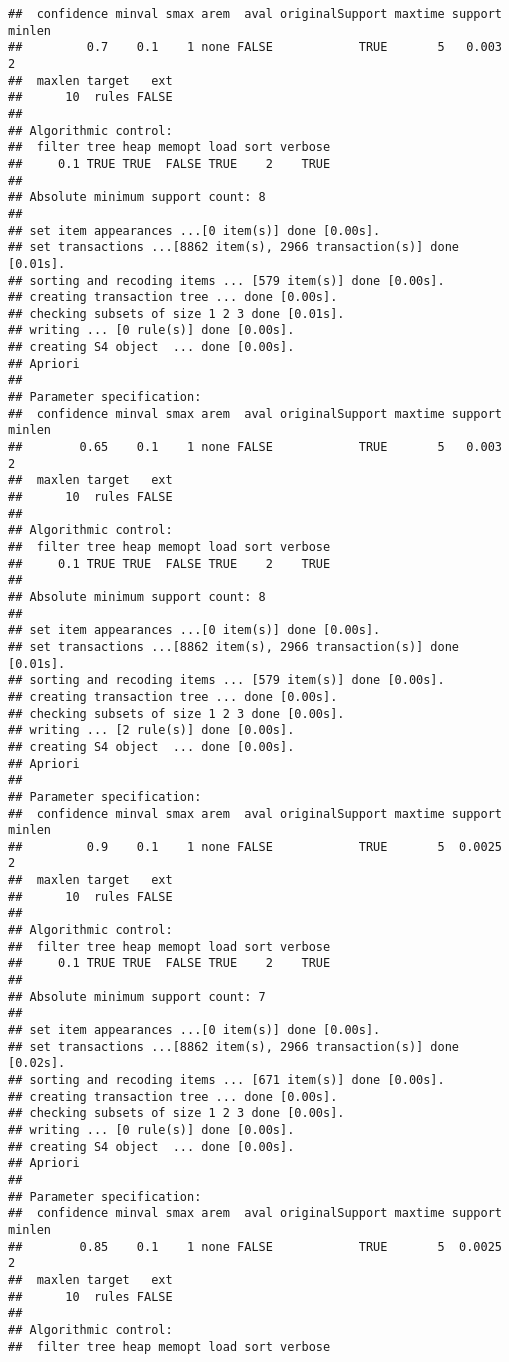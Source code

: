 \documentclass[]{article}
\begin{document}
\begin{verbatim}
##  confidence minval smax arem  aval originalSupport maxtime support minlen
##         0.7    0.1    1 none FALSE            TRUE       5   0.003      2
##  maxlen target   ext
##      10  rules FALSE
## 
## Algorithmic control:
##  filter tree heap memopt load sort verbose
##     0.1 TRUE TRUE  FALSE TRUE    2    TRUE
## 
## Absolute minimum support count: 8 
## 
## set item appearances ...[0 item(s)] done [0.00s].
## set transactions ...[8862 item(s), 2966 transaction(s)] done [0.01s].
## sorting and recoding items ... [579 item(s)] done [0.00s].
## creating transaction tree ... done [0.00s].
## checking subsets of size 1 2 3 done [0.01s].
## writing ... [0 rule(s)] done [0.00s].
## creating S4 object  ... done [0.00s].
## Apriori
## 
## Parameter specification:
##  confidence minval smax arem  aval originalSupport maxtime support minlen
##        0.65    0.1    1 none FALSE            TRUE       5   0.003      2
##  maxlen target   ext
##      10  rules FALSE
## 
## Algorithmic control:
##  filter tree heap memopt load sort verbose
##     0.1 TRUE TRUE  FALSE TRUE    2    TRUE
## 
## Absolute minimum support count: 8 
## 
## set item appearances ...[0 item(s)] done [0.00s].
## set transactions ...[8862 item(s), 2966 transaction(s)] done [0.01s].
## sorting and recoding items ... [579 item(s)] done [0.00s].
## creating transaction tree ... done [0.00s].
## checking subsets of size 1 2 3 done [0.00s].
## writing ... [2 rule(s)] done [0.00s].
## creating S4 object  ... done [0.00s].
## Apriori
## 
## Parameter specification:
##  confidence minval smax arem  aval originalSupport maxtime support minlen
##         0.9    0.1    1 none FALSE            TRUE       5  0.0025      2
##  maxlen target   ext
##      10  rules FALSE
## 
## Algorithmic control:
##  filter tree heap memopt load sort verbose
##     0.1 TRUE TRUE  FALSE TRUE    2    TRUE
## 
## Absolute minimum support count: 7 
## 
## set item appearances ...[0 item(s)] done [0.00s].
## set transactions ...[8862 item(s), 2966 transaction(s)] done [0.02s].
## sorting and recoding items ... [671 item(s)] done [0.00s].
## creating transaction tree ... done [0.00s].
## checking subsets of size 1 2 3 done [0.00s].
## writing ... [0 rule(s)] done [0.00s].
## creating S4 object  ... done [0.00s].
## Apriori
## 
## Parameter specification:
##  confidence minval smax arem  aval originalSupport maxtime support minlen
##        0.85    0.1    1 none FALSE            TRUE       5  0.0025      2
##  maxlen target   ext
##      10  rules FALSE
## 
## Algorithmic control:
##  filter tree heap memopt load sort verbose

\end{verbatim}
\end{document}
